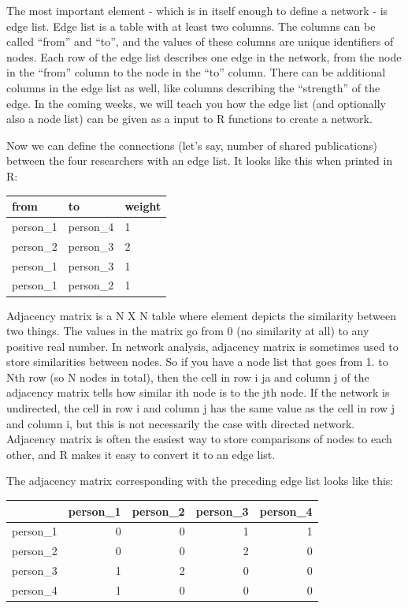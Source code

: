 \documentclass[
]{book}
\begin{document}
The most important element - which is in itself enough to define a network - is edge list. Edge list is a table with at least two columns. The columns can be called ``from'' and ``to'', and the values of these columns are unique identifiers of nodes. Each row of the edge list describes one edge in the network, from the node in the ``from'' column to the node in the ``to'' column. There can be additional columns in the edge list as well, like columns describing the ``strength'' of the edge. In the coming weeks, we will teach you how the edge list (and optionally also a node list) can be given as a input to R functions to create a network.

Now we can define the connections (let's say, number of shared publications) between the four researchers with an edge list. It looks like this when printed in R:

\begin{tabular}{l|l|l}
\hline
from & to & weight\\
\hline
person\_1 & person\_4 & 1\\
\hline
person\_2 & person\_3 & 2\\
\hline
person\_1 & person\_3 & 1\\
\hline
person\_1 & person\_2 & 1\\
\hline
\end{tabular}

Adjacency matrix is a N X N table where element depicts the similarity between two things. The values in the matrix go from 0 (no similarity at all) to any positive real number. In network analysis, adjacency matrix is sometimes used to store similarities between nodes. So if you have a node list that goes from 1. to Nth row (so N nodes in total), then the cell in row i ja and column j of the adjacency matrix tells how similar ith node is to the jth node. If the network is undirected, the cell in row i and column j has the same value as the cell in row j and column i, but this is not necessarily the case with directed network. Adjacency matrix is often the easiest way to store comparisons of nodes to each other, and R makes it easy to convert it to an edge list.

The adjacency matrix corresponding with the preceding edge list looks like this:

\begin{tabular}{l|r|r|r|r}
\hline
  & person\_1 & person\_2 & person\_3 & person\_4\\
\hline
person\_1 & 0 & 0 & 1 & 1\\
\hline
person\_2 & 0 & 0 & 2 & 0\\
\hline
person\_3 & 1 & 2 & 0 & 0\\
\hline
person\_4 & 1 & 0 & 0 & 0\\
\hline
\end{tabular}
\end{document}
